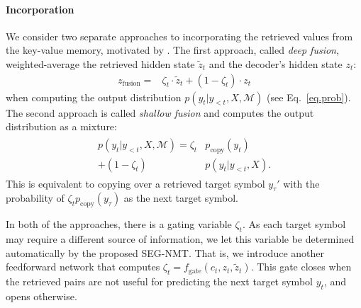 



\vspace{-7pt}
\paragraph{Incorporation}

We consider two separate approaches to incorporating the retrieved values from the key-value memory, motivated by \citep{Gulcehre-Orhan-et-al-2015}. The first approach, called {\it deep fusion}, weighted-average the retrieved hidden state $\tilde{z}_t$ and the decoder's hidden state $z_t$:
\begin{align}
\label{eq.deep}
z_{\text{fusion}} = &\zeta_t \cdot \tilde{z}_t + (1 -\zeta_t) \cdot z_t 
\end{align}
when computing the output distribution $p(y_t|y_{<t},X, \mathcal{M})$ (see Eq.~\eqref{eq.prob}). The second approach is called {\it shallow fusion} and computes the output distribution as a mixture:
\begin{align}
\label{eq.shallow}
\begin{split}
p(y_t| y_{<t}, X, \mathcal{M}) = \zeta_t &p_{\text{copy}}(y_t) \\
+ (1-\zeta_t) &p(y_t|y_{<t}, X).
\end{split}
\end{align}
This is equivalent to copying over a retrieved target symbol $y_{\tau}'$ with the probability of $\zeta_t p_{\text{copy}}(y_{\tau})$ as the next target symbol\citep{gulcehre2016pointing,gu2016incorporating}.%

In both of the approaches, there is a gating variable $\zeta_t$. As each target symbol may require a different source of information, we let this variable be determined automatically by the proposed SEG-NMT. That is, we introduce another feedforward network that computes $\zeta_t = f_{\text{gate}}(c_t, z_t, \tilde{z}_t)$. This gate closes when the retrieved pairs are not useful for predicting the next target symbol $y_t$, and opens otherwise. 

